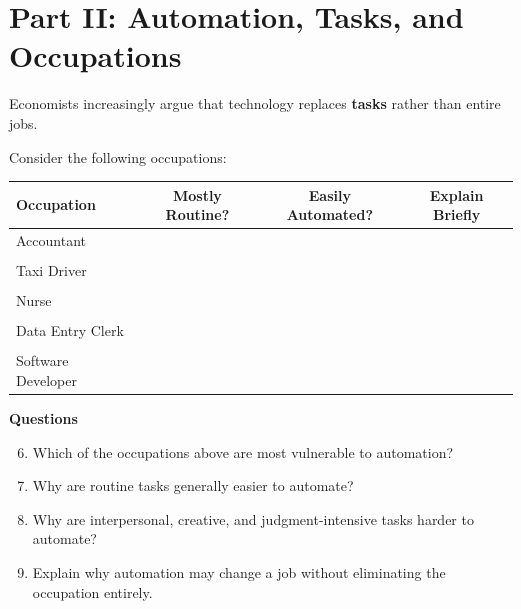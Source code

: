 \documentclass[12pt]{article}
\begin{document}
\newpage

\section*{Part II: Automation, Tasks, and Occupations}

Economists increasingly argue that technology replaces \textbf{tasks} rather than entire jobs.

Consider the following occupations:

\begin{center}
\begin{tabular}{lccc}
\toprule
Occupation & Mostly Routine? & Easily Automated? & Explain Briefly \\
\midrule
Accountant & & & \\
\vspace{0.5cm}\\
Taxi Driver & & & \\
\vspace{0.5cm}\\
Nurse & & & \\
\vspace{0.5cm}\\
Data Entry Clerk & & & \\
\vspace{0.5cm}\\
Software Developer & & & \\
\bottomrule
\end{tabular}
\end{center}

\textbf{Questions}

\begin{enumerate}[label=\arabic*.]
\setcounter{enumi}{5}
\item Which of the occupations above are most vulnerable to automation?
\vspace{2cm}

\item Why are routine tasks generally easier to automate?
\vspace{2cm}

\item Why are interpersonal, creative, and judgment-intensive tasks harder to automate?
\vspace{2cm}

\item Explain why automation may change a job without eliminating the occupation entirely.
\vspace{2.5cm}
\end{enumerate}
\end{document}
